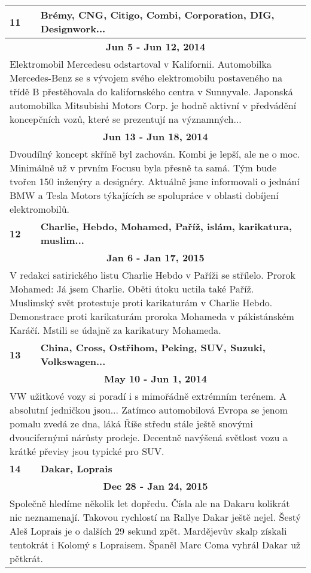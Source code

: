 \begin{tabularx}{\linewidth}{l l}
\bf 11 & \bf Brémy, CNG, Citigo, Combi, Corporation, DIG, Designwork... \\ \midrule
\multicolumn{2}{c}{\bf Jun 5 - Jun 12, 2014} \\
\multicolumn{2}{p{\linewidth}}{Elektromobil Mercedesu odstartoval v Kalifornii. Automobilka Mercedes-Benz se s vývojem svého elektromobilu postaveného na třídě B přestěhovala do kalifornského centra v Sunnyvale. Japonská automobilka Mitsubishi Motors Corp. je hodně aktivní v předvádění koncepčních vozů, které se prezentují na významných...} \\ \midrule
\multicolumn{2}{c}{\bf Jun 13 - Jun 18, 2014} \\
\multicolumn{2}{p{\linewidth}}{Dvoudílný koncept skříně byl zachován. Kombi je lepší, ale ne o moc. Minimálně už v prvním Focusu byla přesně ta samá. Tým bude tvořen 150 inženýry a designéry. Aktuálně jsme informovali o jednání BMW a Tesla Motors týkajících se spolupráce v oblasti dobíjení elektromobilů.} \\ \midrule[1.5pt]

\bf 12 & \bf Charlie, Hebdo, Mohamed, Paříž, islám, karikatura, muslim... \\ \midrule
\multicolumn{2}{c}{\bf Jan 6 - Jan 17, 2015} \\
\multicolumn{2}{p{\linewidth}}{V redakci satirického listu Charlie Hebdo v Paříži se střílelo. Prorok Mohamed: Já jsem Charlie. Oběti útoku uctila také Paříž. Muslimský svět protestuje proti karikaturám v Charlie Hebdo. Demonstrace proti karikaturám proroka Mohameda v pákistánském Karáčí. Mstili se údajně za karikatury Mohameda.} \\ \midrule[1.5pt]

\bf 13 & \bf China, Cross, Ostřihom, Peking, SUV, Suzuki, Volkswagen... \\ \midrule
\multicolumn{2}{c}{\bf May 10 - Jun 1, 2014} \\
\multicolumn{2}{p{\linewidth}}{VW užitkové vozy si poradí i s mimořádně extrémním terénem. A absolutní jedničkou jsou... Zatímco automobilová Evropa se jenom pomalu zvedá ze dna, láká Říše středu stále ještě snovými dvoucifernými nárůsty prodeje. Decentně navýšená světlost vozu a krátké převisy jsou typické pro SUV.} \\ \midrule[1.5pt]

\bf 14 & \bf Dakar, Loprais \\ \midrule
\multicolumn{2}{c}{\bf Dec 28 - Jan 24, 2015} \\
\multicolumn{2}{p{\linewidth}}{Společně hledíme několik let dopředu. Čísla ale na Dakaru kolikrát nic neznamenají. Takovou rychlostí na Rallye Dakar ještě nejel. Šestý Aleš Loprais je o dalších 29 sekund zpět. Mardějevův skalp získali tentokrát i Kolomý s Lopraisem. Španěl Marc Coma vyhrál Dakar už pětkrát.} \\ \midrule[1.5pt]


\end{tabularx}
